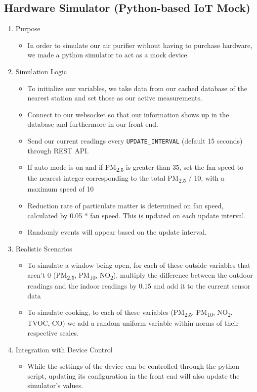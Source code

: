 \documentclass[conference]{IEEEtran}
\begin{document}
    \subsection{\textbf{Hardware Simulator (Python-based IoT Mock)}}
        \begin{enumerate}
            \item Purpose
                \begin{itemize}
                    \item In order to simulate our air purifier without having to purchase hardware, we made a python simulator to act as a mock device.
                \end{itemize}
            \item Simulation Logic
                \begin{itemize}
                    \item To initialize our variables, we take data from our cached database of the nearest station and set those as our active measurements.
                    \item Connect to our websocket so that our information shows up in the database and furthermore in our front end.
                    \item Send our current readings every \texttt{UPDATE\_INTERVAL} (default 15 seconds) through REST API.
                    \item If auto mode is on and if PM\textsubscript{2.5} is greater than 35, set the fan speed to the nearest integer corresponding to the total PM\textsubscript{2.5} / 10, with a maximum speed of 10
                    \item Reduction rate of particulate matter is determined on fan speed, calculated by 0.05 * fan speed. This is updated on each update interval.
                    \item Randomly events will appear based on the update interval.
                \end{itemize}
            \item Realistic Scenarios
                \begin{itemize}
                    \item To simulate a window being open, for each of these outside variables that aren't 0 (PM\textsubscript{2.5}, PM\textsubscript{10}, NO\textsubscript{2}), multiply the difference between the outdoor readings and the indoor readings by 0.15 and add it to the current sensor data
                    \item To simulate cooking, to each of these variables (PM\textsubscript{2.5}, PM\textsubscript{10}, NO\textsubscript{2}, TVOC, CO) we add a random uniform variable within norms of their respective scales.
                \end{itemize}
            \item Integration with Device Control
                \begin{itemize}
                    \item While the settings of the device can be controlled through the python script, updating its configuration in the front end will also update the simulator's values.
                \end{itemize}
        \end{enumerate}
\end{document}
